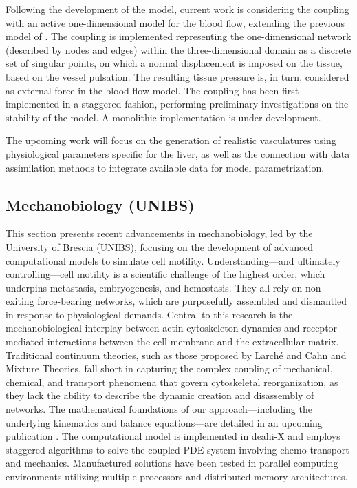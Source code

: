 \documentclass[a4paper,12pt]{article}
\begin{document}
Following the development of the model, current work is considering the coupling with an active one-dimensional model for the blood flow, extending the previous model of \cite{heltai2021multiscale}. The coupling is implemented representing the one-dimensional network (described by nodes and edges) within the three-dimensional domain as a discrete set of singular points, on which a normal displacement is imposed on the tissue, based on the vessel pulsation. The resulting tissue pressure is, in turn, considered as external force in the blood flow model. The coupling has been first implemented in a staggered fashion, performing preliminary investigations on the stability of the model. A monolithic implementation is under development.

The upcoming work will focus on the generation of realistic vasculatures using physiological parameters specific for the liver, as well as the connection with data assimilation methods to integrate available data for model parametrization.

\subsection{Mechanobiology (UNIBS)}

This section presents recent advancements in mechanobiology, led by the University of Brescia (UNIBS), focusing on the development of advanced computational models to simulate cell motility. Understanding—and ultimately controlling—cell motility is a scientific challenge of the highest order, which underpins metastasis, embryogenesis, and hemostasis. They all rely on non-exiting force-bearing networks, which are purposefully assembled and dismantled in response to physiological demands. Central to this research is the mechanobiological interplay between actin cytoskeleton dynamics and receptor-mediated interactions between the cell membrane and the extracellular matrix. Traditional continuum theories, such as those proposed by Larché and Cahn and Mixture Theories, fall short in capturing the complex coupling of mechanical, chemical, and transport phenomena that govern cytoskeletal reorganization, as they lack the ability to describe the dynamic creation and disassembly of networks. The mathematical foundations of our approach—including the underlying kinematics and balance equations—are detailed in an upcoming publication \cite{salvadori2025chemo}. The computational model is implemented in dealii-X and employs staggered algorithms to solve the coupled PDE system involving chemo-transport and mechanics. Manufactured solutions have been tested in parallel computing environments utilizing multiple processors and distributed memory architectures.
\end{document}
